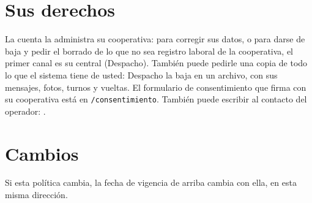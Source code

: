\documentclass[10.5pt,a4paper]{article}
\begin{document}
\section{Sus derechos}
La cuenta la administra su cooperativa: para corregir sus datos, o para darse
de baja y pedir el borrado de lo que no sea registro laboral de la
cooperativa, el primer canal es su central (Despacho). También puede pedirle
una copia de todo lo que el sistema tiene de usted: Despacho la baja en un
archivo, con sus mensajes, fotos, turnos y vueltas. El formulario de
consentimiento que firma con su cooperativa está en \texttt{/consentimiento}.
También puede escribir al contacto del operador: \llenar[7cm].

\section{Cambios}
Si esta política cambia, la fecha de vigencia de arriba cambia con ella, en
esta misma dirección.
\end{document}
